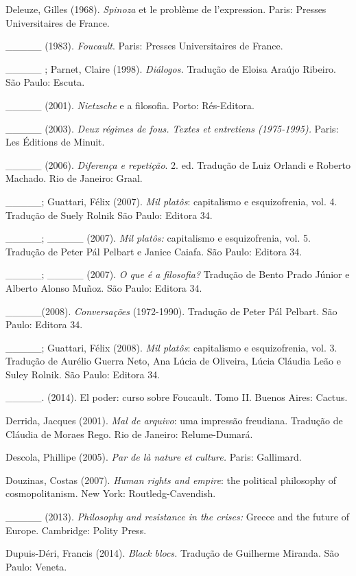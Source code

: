 Deleuze, Gilles (1968). \emph{Spinoza} et le problème de l'expression.
Paris: Presses Universitaires de France.

\_\_\_\_\_ (1983). \emph{Foucault}. Paris: Presses Universitaires de
France.

\_\_\_\_\_ ; Parnet, Claire (1998). \emph{Diálogos.} Tradução de Eloisa
Araújo Ribeiro. São Paulo: Escuta.

\_\_\_\_\_ (2001). \emph{Nietzsche} e a filosofia. Porto: Rés-Editora.

\_\_\_\_\_ (2003). \emph{Deux régimes de fous. Textes et entretiens
(1975-1995). }Paris: Les Éditions de Minuit.

\_\_\_\_\_ (2006). \emph{Diferença e repetição}. 2. ed. Tradução de Luiz
Orlandi e Roberto Machado. Rio de Janeiro: Graal.

\_\_\_\_\_; Guattari, Félix (2007). \emph{Mil platôs}: capitalismo e
esquizofrenia, vol. 4. Tradução de Suely Rolnik São Paulo: Editora 34.

\_\_\_\_\_; \_\_\_\_\_ (2007). \emph{Mil platôs: }capitalismo e
esquizofrenia, vol. 5. Tradução de Peter Pál Pelbart e Janice Caiafa.
São Paulo: Editora 34.

\_\_\_\_\_; \_\_\_\_\_ (2007). \emph{O que é a filosofia? }Tradução de
Bento Prado Júnior e Alberto Alonso Muñoz. São Paulo: Editora 34.

\_\_\_\_\_(2008). \emph{Conversações} (1972-1990). Tradução de Peter Pál
Pelbart. São Paulo: Editora 34.

\_\_\_\_\_; Guattari, Félix (2008). \emph{Mil platôs}: capitalismo e
esquizofrenia, vol. 3. Tradução de Aurélio Guerra Neto, Ana Lúcia de
Oliveira, Lúcia Cláudia Leão e Suley Rolnik. São Paulo: Editora 34.

\_\_\_\_\_. (2014). El poder: curso sobre Foucault. Tomo II. Buenos
Aires: Cactus.

Derrida, Jacques (2001). \emph{Mal de arquivo}: uma impressão freudiana.
Tradução de Cláudia de Moraes Rego. Rio de Janeiro: Relume-Dumará.

Descola, Phillipe (2005). \emph{Par de là nature et culture. }Paris:
Gallimard.

Douzinas, Costas (2007). \emph{Human rights and empire}: the political
philosophy of cosmopolitanism. New York: Routledg-Cavendish.

\_\_\_\_\_ (2013). \emph{Philosophy and resistance in the crises:
}Greece and the future of Europe. Cambridge: Polity Press.

Dupuis-Déri, Francis (2014). \emph{Black blocs. }Tradução de Guilherme
Miranda. São Paulo: Veneta.


